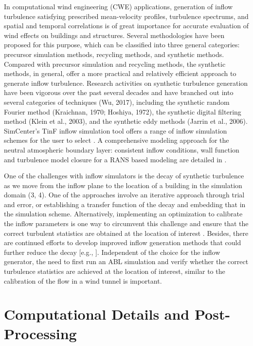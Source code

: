 In computational wind engineering (CWE) applications, generation of inflow turbulence satisfying prescribed mean-velocity profiles, turbulence spectrums, and spatial and temporal correlations is of great importance for accurate evaluation of wind effects on buildings and structures. Several methodologies have been proposed for this purpose, which can be classified into three general categories: precursor simulation methods, recycling methods, and synthetic methods. Compared with precursor simulation and recycling methods, the synthetic methods, in general, offer a more practical and relatively efficient approach to generate inflow turbulence. Research activities on synthetic turbulence generation have been vigorous over the past several decades and have branched out into several categories of techniques (Wu, 2017), including the synthetic random Fourier method (Kraichnan, 1970; Hoshiya, 1972), the synthetic digital filtering method (Klein et al., 2003), and the synthetic eddy methods (Jarrin et al., 2006). SimCenter's TinF inflow simulation tool offers a range of inflow simulation schemes for the user to select \citep{tinf2020}. A comprehensive modeling approach for the neutral atmospheric boundary layer: consistent inflow conditions, wall function and turbulence model closure for a RANS based modeling are detailed in \citep{parente2011comprehensive}.

One of the challenges with inflow simulators is the decay of synthetic turbulence as we move from the inflow plane to the location of a building in the simulation domain (3, 4). One of the approaches involve an iterative approach through trial and error, or establishing a transfer function of the decay and embedding that in the simulation scheme. Alternatively,  implementing an optimization to calibrate the inflow parameters is one way to circumvent this challenge and ensure that the correct turbulent statistics are obtained at the location of interest \citep{lamberti2018optimizing}. Besides, there are continued efforts to develop improved inflow generation methods that could further reduce the decay [e.g., \citep{bervida2020synthetic}]. Independent of the choice for the inflow generator, the need to first run an ABL simulation and verify whether the correct turbulence statistics are achieved at the location of interest, similar to the calibration of the flow in a wind tunnel is important.


\section{Computational Details and Post-Processing}
\label{sec:resp_cfd_wind_flow_modeling}

